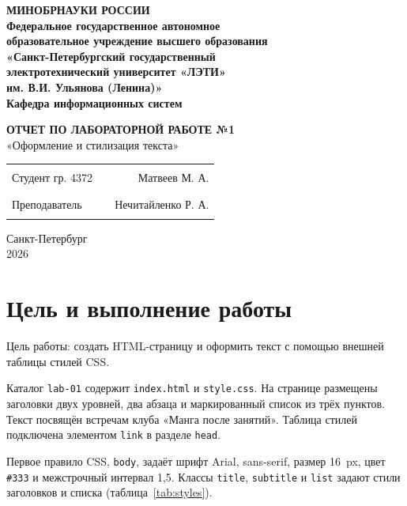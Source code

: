 \documentclass[14pt,a4paper]{extarticle}
\newcommand{\code}[1]{{\fontsize{12}{14}\selectfont\texttt{#1}}}
\begin{document}
\begin{titlepage}
\thispagestyle{empty}
\begin{center}
\bfseries
МИНОБРНАУКИ РОССИИ\\
Федеральное государственное автономное\\
образовательное учреждение высшего образования\\
«Санкт-Петербургский государственный\\
электротехнический университет «ЛЭТИ»\\
им. В.И. Ульянова (Ленина)»\\
Кафедра информационных систем
\end{center}
\vspace{30mm}
\begin{center}
\textbf{ОТЧЕТ ПО ЛАБОРАТОРНОЙ РАБОТЕ №1}\\[8mm]
«Оформление и стилизация текста»
\end{center}
\vfill
\noindent\begin{tabularx}{\textwidth}{@{}lXr@{}}
Студент гр. 4372 & \centering\rule{25mm}{0.3pt} & Матвеев М. А.\\[8mm]
Преподаватель & \centering\rule{25mm}{0.3pt} & Нечитайленко Р. А.\\
\end{tabularx}
\vspace{20mm}
\begin{center}
Санкт-Петербург\\
2026
\end{center}
\end{titlepage}
\setcounter{page}{2}

\section{Цель и выполнение работы}
Цель работы: создать HTML-страницу и оформить текст с помощью внешней таблицы стилей CSS.

Каталог \code{lab-01} содержит \code{index.html} и \code{style.css}. На странице размещены заголовки двух уровней, два абзаца и маркированный список из трёх пунктов. Текст посвящён встречам клуба «Манга после занятий». Таблица стилей подключена элементом \code{link} в разделе \code{head}.

Первое правило CSS, \code{body}, задаёт шрифт Arial, sans-serif, размер 16~px, цвет \code{\#333} и межстрочный интервал 1,5. Классы \code{title}, \code{subtitle} и \code{list} задают стили заголовков и списка (таблица~\ref{tab:styles}).
\end{document}
